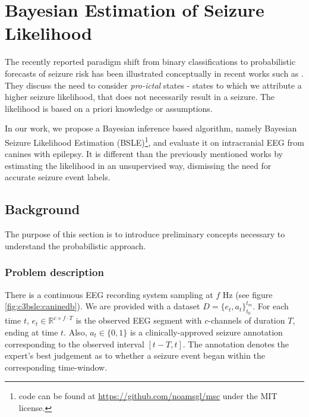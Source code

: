 
\chapter{Bayesian Estimation of Seizure Likelihood}
\label{ch:3Bsle}

The recently reported paradigm shift from binary classifications to probabilistic forecasts of seizure risk has been illustrated conceptually in recent works such as \citet{karoly2017circadian, baud2018multi, baud2020chance}. They discuss the need to consider \emph{pro-ictal} states - states to which we attribute a higher seizure likelihood, that does not necessarily result in a seizure. The likelihood is based on a priori knowledge or assumptions.

In our work, we propose a Bayesian inference based algorithm, namely Bayesian Seizure Likelihood Estimation (BSLE)\footnote{code can be found at \url{https://github.com/noamsgl/msc} under the MIT license.}, and evaluate it on intracranial EEG from canines with epilepsy. It is different than the previously mentioned works by estimating the likelihood in an unsupervised way, dismissing the need for accurate seizure event labels.


\section{Background}
The purpose of this section is to introduce preliminary concepts necessary to understand the probabilistic approach.



\subsection{Problem description}
\label{sec:2background:setup}

There is a continuous EEG recording system sampling at $f$ Hz (see figure \ref{fig:c3bsle:caninedb}). We are provided with a dataset $D = \{e_t, a_t\}_{t_0}^{t_m}$. For each time $t$, $e_t \in \mathbb{R}^{c \times f \cdot T}$ is the observed EEG segment with $c$-channels of duration $T$, ending at time $t$. Also, $a_t \in \{0, 1\}$ is a clinically-approved seizure annotation corresponding to the observed interval $[t - T, t]$. The annotation denotes the expert's best judgement as to whether a seizure event began within the corresponding time-window.

